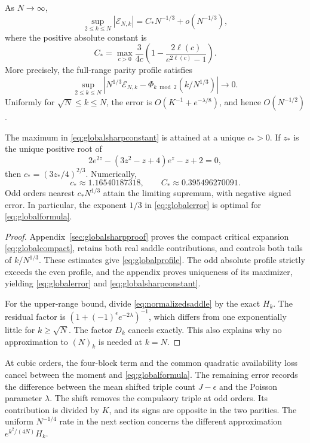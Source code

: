 \begin{theorem}\label{thm:global}
As $N\to\infty$,
\begin{equation}\label{eq:globalerror}
\sup_{2\le k\le N}|\mathcal E_{N,k}|
=C_*N^{-1/3}+o(N^{-1/3}),
\end{equation}
where the positive absolute constant is
\begin{equation}\label{eq:globalsharpconstant}
C_*=\max_{c>0}\frac3{4c}
\left(1-\frac{2\ell(c)}{e^{2\ell(c)}-1}\right).
\end{equation}
More precisely, the full-range parity profile satisfies
\begin{equation}\label{eq:globalprofile}
\sup_{2\le k\le N}
\left|N^{1/3}\mathcal E_{N,k}
-\Phi_{k\bmod2}(k/N^{1/3})\right|\longrightarrow0.
\end{equation}
Uniformly for $\sqrt N\le k\le N$, the error is
$O(K^{-1}+e^{-\lambda/8})$, and hence $O(N^{-1/2})$.

The maximum in \eqref{eq:globalsharpconstant} is attained at a unique $c_*>0$. If $z_*$ is the unique positive root of
\begin{equation}\label{eq:globalmaxequation}
2e^{2z}-(3z^2-z+4)e^z-z+2=0,
\end{equation}
then $c_*=(3z_*/4)^{2/3}$. Numerically,
\[
c_*\approx1.16540187318,\qquad C_*\approx0.395496270091.
\]
Odd orders nearest $c_*N^{1/3}$ attain the limiting supremum, with negative signed error. In particular, the exponent $1/3$ in \eqref{eq:globalerror} is optimal for \eqref{eq:globalformula}.
\end{theorem}
\begin{proof}
Appendix~\ref{sec:globalsharpproof} proves the compact critical expansion \eqref{eq:globalcompact}, retains both real saddle contributions, and controls both tails of $k/N^{1/3}$. These estimates give \eqref{eq:globalprofile}. The odd absolute profile strictly exceeds the even profile, and the appendix proves uniqueness of its maximizer, yielding \eqref{eq:globalerror} and \eqref{eq:globalsharpconstant}.

For the upper-range bound, divide \eqref{eq:normalizedsaddle} by the exact $H_k$. The residual factor is $(1+(-1)^\epsilon e^{-2\lambda})^{-1}$, which differs from one exponentially little for $k\ge\sqrt N$. The factor $D_k$ cancels exactly. This also explains why no approximation to $(N)_k$ is needed at $k=N$.
\end{proof}

At cubic orders, the four-block term and the common quadratic availability loss cancel between the moment and \eqref{eq:globalformula}. The remaining error records the difference between the mean shifted triple count $J-\epsilon$ and the Poisson parameter $\lambda$. The shift removes the compulsory triple at odd orders. Its contribution is divided by $K$, and its signs are opposite in the two parities. The uniform $N^{-1/4}$ rate in the next section concerns the different approximation $e^{k^2/(4N)}H_k$.


